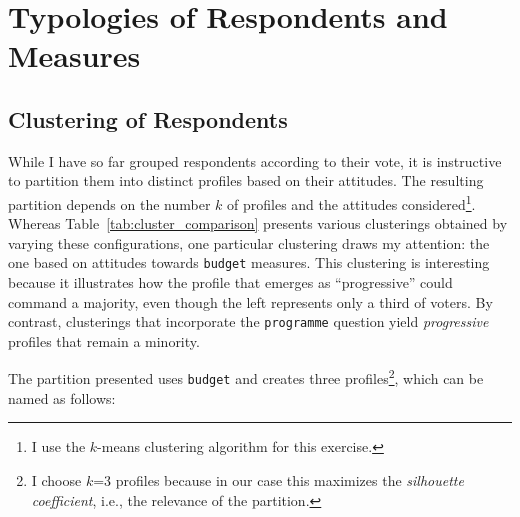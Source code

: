 \documentclass[12pt,english]{article}
\newcommand{\blue}[1]{\textcolor{blue!60!black}{#1}}
\begin{document}
\section{Typologies of Respondents and Measures}
\label{sec:clusters}

\subsection{Clustering of Respondents}

While I have so far grouped respondents according to their vote, it is instructive to partition them into distinct profiles based on their attitudes. The resulting partition depends on the number $k$ of profiles and the attitudes considered\footnote{I use the $k$-means clustering algorithm for this exercise.}. Whereas Table~\ref{tab:cluster_comparison} presents various clusterings obtained by varying these configurations, one particular clustering draws my attention: the one based on attitudes towards \texttt{budget} measures. This clustering is interesting because it illustrates how the profile that emerges as ``progressive'' could command a majority, even though the left represents only a third of voters. By contrast,
clusterings that incorporate the \texttt{programme} question yield \textit{progressive} profiles that remain a minority.

\blue{The partition presented uses \texttt{budget} and creates three profiles}\footnote{I choose $k$=3 profiles because in our case this maximizes the \textit{silhouette coefficient}, i.e., the relevance of the partition.}, which can be named as follows:
\end{document}
